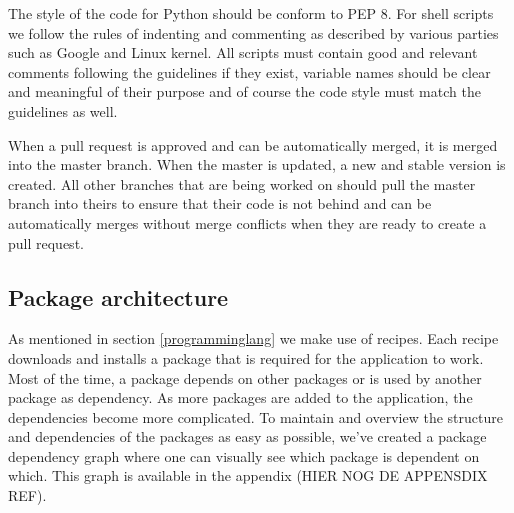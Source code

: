 The style of the code for Python should be conform to PEP 8. For shell scripts we follow the rules of indenting and commenting as described by various parties such as Google and Linux kernel.
All scripts must contain good and relevant comments following the guidelines if they exist, variable names should be clear and meaningful of their purpose and of course the code style must match the guidelines as well.

When a pull request is approved and can be automatically merged, it is merged into the master branch. When the master is updated, a new and stable version is created. All other branches that are being worked on should pull the master branch into theirs to ensure that their code is not behind and can be automatically merges without merge conflicts when they are ready to create a pull request.

\subsection{Package architecture}
As mentioned in section \ref{programminglang} we make use of recipes. Each recipe downloads and installs a package that is required for the application to work. Most of the time, a package depends on other packages or is used by another package as dependency. As more packages are added to the application, the dependencies become more complicated.
To maintain and overview the structure and dependencies of the packages as easy as possible, we've created a package dependency graph where one can visually see which package is dependent on which. This graph is available in the appendix (HIER NOG DE APPENSDIX REF).